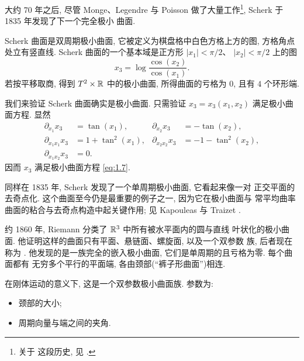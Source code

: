 
大约 70 年之后, 尽管 Monge、Legendre 与 Poisson 做了大量工作\footnote{关于
这段历史, 见 \cite{Os5}.}, Scherk \cite{Sk} 于 1835 年发现了下一个完全极小
曲面.

Scherk 曲面是双周期极小曲面, 它被定义为棋盘格中白色方格上方的图, 方格角点
处立有竖直线. Scherk 曲面的一个基本域是正方形 $|x_1|<\pi/2$、
$|x_2|<\pi/2$ 上的图
\begin{equation}
x_3=\log\frac{\cos(x_2)}{\cos(x_1)}.
\label{eq:1.48}
\end{equation}
若按平移取商, 得到 $T^2\times\mathbb{R}$ 中的极小曲面, 所得曲面的亏格为 $0$, 且有
$4$ 个环形端.

我们来验证 Scherk 曲面确实是极小曲面. 只需验证
$x_3=x_3(x_1,x_2)$ 满足极小曲面方程. 显然
\begin{align*}
\partial_{x_1}x_3&=\tan(x_1), &
\partial_{x_2}x_3&=-\tan(x_2),\\
\partial_{x_1x_1}x_3&=1+\tan^2(x_1), &
\partial_{x_2x_2}x_3&=-1-\tan^2(x_2),\\
\partial_{x_1x_2}x_3&=0. &&
\end{align*}
因而 $x_3$ 满足极小曲面方程 \eqref{eq:1.7}.


同样在 1835 年, Scherk \cite{Sk} 发现了一个单周期极小曲面, 它看起来像一对
正交平面的去奇点化. 这个曲面至今仍是最重要的例子之一, 因为它在极小曲面与
常平均曲率曲面的粘合与去奇点构造中起关键作用; 见 Kapouleas \cite{Ka} 与
Traizet \cite{Tr1}.


约 1860 年, Riemann \cite{Ri} 分类了 $\mathbb{R}^3$ 中所有被水平面内的圆与直线
叶状化的极小曲面. 他证明这样的曲面只有平面、悬链面、螺旋面, 以及一个双参数
族, 后者现在称为 .
他发现的是一族完全的嵌入极小曲面, 它们是单周期的且亏格为零. 每个曲面都有
无穷多个平行的平面端, 各由颈部(``裤子形曲面'')相连.

在刚体运动的意义下, 这是一个双参数极小曲面族. 参数为:
\begin{itemize}
  \item 颈部的大小;
  \item 周期向量与端之间的夹角.
\end{itemize}

